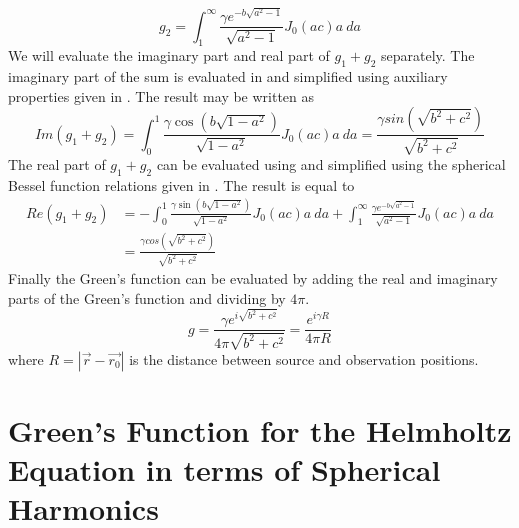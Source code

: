\begin{equation}
g_2=\int_{1}^{\infty}\frac{\gamma e^{-b\sqrt{a^2-1}}}{\sqrt{a^2-1}} J_0(ac)a~ da 
\end{equation}
We will evaluate the imaginary part and real part of $g_1 +g_2$ separately.
The imaginary part of the sum is evaluated in \cite[p.~40(48)]{erdelyi1954tables} and simplified using
auxiliary properties given in \cite{abramowitz1972handbook}.
The result may be written as
%
\begin{equation}
\label{he4}
Im(g_1 +g_2 )=
\int_{0}^{1}\frac{\gamma \cos{(b\sqrt{1-a^2})}}{\sqrt{1-a^2}} J_0(ac)a ~da = \frac{ \gamma sin ( \sqrt{b^2+c^2} )}{ \sqrt{b^2 + c^2}}
\end{equation}
%
The real part of $g_1+g_2$ can be evaluated using \cite [p.~35(23)]{erdelyi1954tables} and simplified
using the spherical Bessel function relations given in \cite[p.~438(10.1.11),p.~438(10.1.12)]{abramowitz1972handbook}.
The result is equal to 
%
\begin{equation}
\label{he5}
\begin{split}
Re(g_1 +g_2)& = -\int_{0}^{1}\frac{\gamma \sin{(b\sqrt{1-a^2})}}{\sqrt{1-a^2}} J_0(ac)a ~da 
+\int_{1}^{\infty}\frac{\gamma e^{-b\sqrt{a^2-1}}}{\sqrt{a^2-1}} J_0(ac)a~ da \\
& = \frac{ \gamma cos ( \sqrt{b^2+c^2} )}{ \sqrt{b^2 + c^2}}
\end{split}
\end{equation}
%
Finally the Green's function can be evaluated by adding
the real and imaginary parts of the Green's function and dividing by ${4\pi}$.
%
\begin{equation}
\label{chap1Green}
g =   \frac{ \gamma e^{i \sqrt{b^2+c^2}}}{ 4 \pi \sqrt{b^2 + c^2}} =  \frac{  e^{i \gamma R}}{ 4 \pi R}
\end{equation}
%
where $R=|\vec{r}-\vec{r_0}|$ is the distance between source and observation positions.
\newpage
\section{Green's Function for the Helmholtz Equation in terms of Spherical Harmonics }


